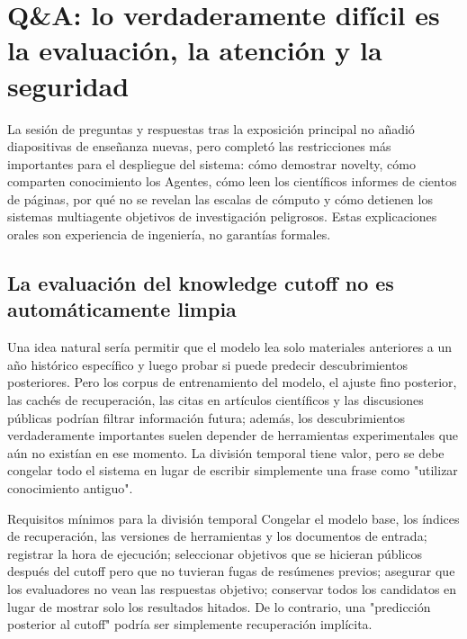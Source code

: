 \section{Q\&A: lo verdaderamente difícil es la evaluación, la atención y la seguridad}

La sesión de preguntas y respuestas tras la exposición principal no añadió diapositivas de enseñanza nuevas, pero completó las restricciones más importantes para el despliegue del sistema: cómo demostrar novelty, cómo comparten conocimiento los Agentes, cómo leen los científicos informes de cientos de páginas, por qué no se revelan las escalas de cómputo y cómo detienen los sistemas multiagente objetivos de investigación peligrosos. Estas explicaciones orales son experiencia de ingeniería, no garantías formales.

\subsection{La evaluación del knowledge cutoff no es automáticamente limpia}

Una idea natural sería permitir que el modelo lea solo materiales anteriores a un año histórico específico y luego probar si puede predecir descubrimientos posteriores. Pero los corpus de entrenamiento del modelo, el ajuste fino posterior, las cachés de recuperación, las citas en artículos científicos y las discusiones públicas podrían filtrar información futura; además, los descubrimientos verdaderamente importantes suelen depender de herramientas experimentales que aún no existían en ese momento. La división temporal tiene valor, pero se debe congelar todo el sistema en lugar de escribir simplemente una frase como "utilizar conocimiento antiguo".

\begin{warningbox}{Requisitos mínimos para la división temporal}
Congelar el modelo base, los índices de recuperación, las versiones de herramientas y los documentos de entrada; registrar la hora de ejecución; seleccionar objetivos que se hicieran públicos después del cutoff pero que no tuvieran fugas de resúmenes previos; asegurar que los evaluadores no vean las respuestas objetivo; conservar todos los candidatos en lugar de mostrar solo los resultados hitados. De lo contrario, una "predicción posterior al cutoff" podría ser simplemente recuperación implícita.
\end{warningbox}



